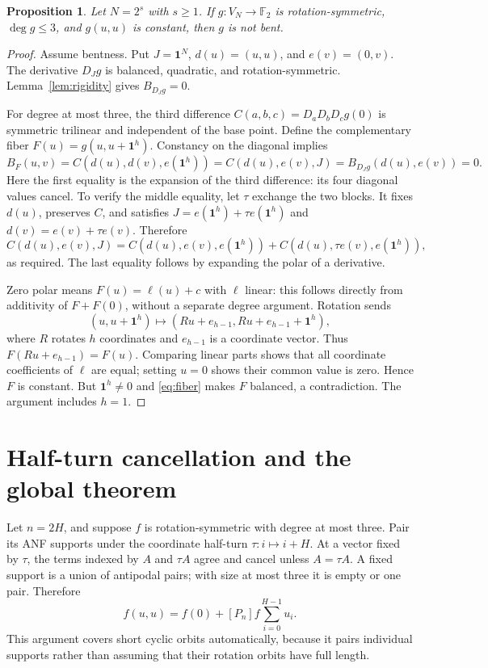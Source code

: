 \documentclass[11pt,a4paper]{article}
\newcommand{\F}{\mathbb F_2}
\newcommand{\one}{\mathbf1}
\newtheorem{proposition}[theorem]{Proposition}
\begin{document}
\begin{proposition}\label{prop:obstruction}
Let $N=2^s$ with $s\ge1$. If $g:V_N\to\F$ is rotation-symmetric, $\deg g\le3$, and $g(u,u)$ is constant, then $g$ is not bent.
\end{proposition}
\begin{proof}
Assume bentness. Put $J=\one^N$, $d(u)=(u,u)$, and $e(v)=(0,v)$. The derivative $D_Jg$ is balanced, quadratic, and rotation-symmetric. Lemma~\ref{lem:rigidity} gives $B_{D_Jg}=0$.

For degree at most three, the third difference
$C(a,b,c)=D_aD_bD_cg(0)$ is symmetric trilinear and independent of the base point. Define the complementary fiber $F(u)=g(u,u+\one^h)$. Constancy on the diagonal implies
\begin{equation}\label{eq:polar}
 B_F(u,v)=C(d(u),d(v),e(\one^h))
 =C(d(u),e(v),J)
 =B_{D_Jg}(d(u),e(v))=0.
\end{equation}
Here the first equality is the expansion of the third difference: its four diagonal values cancel. To verify the middle equality, let $\tau$ exchange the two blocks. It fixes $d(u)$, preserves $C$, and satisfies $J=e(\one^h)+\tau e(\one^h)$ and $d(v)=e(v)+\tau e(v)$. Therefore
\[
 C(d(u),e(v),J)
 =C(d(u),e(v),e(\one^h))
  +C(d(u),\tau e(v),e(\one^h)),
\]
as required. The last equality follows by expanding the polar of a derivative.

Zero polar means $F(u)=\ell(u)+c$ with $\ell$ linear: this follows directly from additivity of $F+F(0)$, without a separate degree argument. Rotation sends
\[
 (u,u+\one^h)\longmapsto
 (Ru+e_{h-1},Ru+e_{h-1}+\one^h),
\]
where $R$ rotates $h$ coordinates and $e_{h-1}$ is a coordinate vector. Thus $F(Ru+e_{h-1})=F(u)$. Comparing linear parts shows that all coordinate coefficients of $\ell$ are equal; setting $u=0$ shows their common value is zero. Hence $F$ is constant. But $\one^h\ne0$ and \eqref{eq:fiber} makes $F$ balanced, a contradiction. The argument includes $h=1$.
\end{proof}

\section{Half-turn cancellation and the global theorem}
Let $n=2H$, and suppose $f$ is rotation-symmetric with degree at most three. Pair its ANF supports under the coordinate half-turn $\tau:i\mapsto i+H$. At a vector fixed by $\tau$, the terms indexed by $A$ and $\tau A$ agree and cancel unless $A=\tau A$. A fixed support is a union of antipodal pairs; with size at most three it is empty or one pair. Therefore
\begin{equation}\label{eq:diag}
 f(u,u)=f(0)+[P_n]f\sum_{i=0}^{H-1}u_i.
\end{equation}
This argument covers short cyclic orbits automatically, because it pairs individual supports rather than assuming that their rotation orbits have full length.
\end{document}
